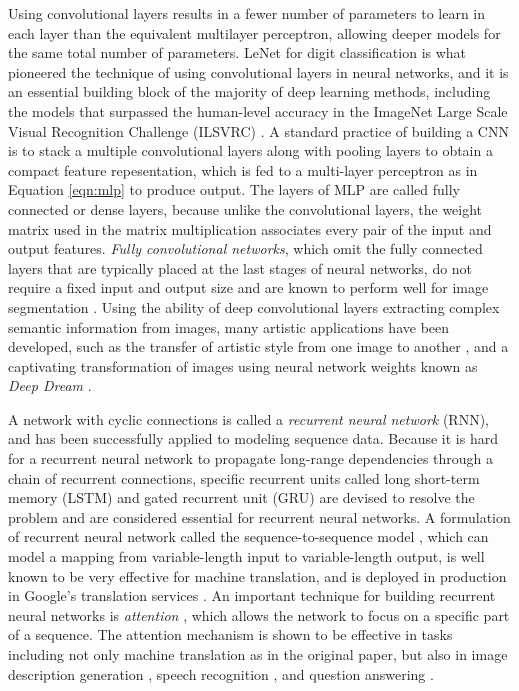 Using convolutional layers results in a fewer number of parameters to learn in each layer than the equivalent multilayer perceptron, allowing deeper models for the same total number of parameters.
LeNet \cite{lecun1995lenet} for digit classification is what pioneered the technique of using convolutional layers in neural networks, and it is an essential building block of the majority of deep learning methods, including the models that surpassed the human-level accuracy in the ImageNet Large Scale Visual Recognition Challenge (ILSVRC) \cite{krizhevsky2012imagenet, simonyan2014vgg, szegedy2015googlenet, he2016resnet}.
A standard practice of building a CNN is to stack a multiple convolutional layers along with pooling layers to obtain a compact feature repesentation, which is fed to a multi-layer perceptron as in Equation \ref{eqn:mlp} to produce output.
The layers of MLP are called fully connected or dense layers, because unlike the convolutional layers, the weight matrix used in the matrix multiplication associates every pair of the input and output features.
\emph{Fully convolutional networks}, which omit the fully connected layers that are typically placed at the last stages of neural networks, do not require a fixed input and output size and are known to perform well for image segmentation \cite{shelhamer2017fcn}.
Using the ability of deep convolutional layers extracting complex semantic information from images, many artistic applications have been developed, such as the transfer of artistic style from one image to another \cite{gatys2015style}, and a captivating transformation of images using neural network weights known as \emph{Deep Dream} \cite{mahendran2016deepdream}.


A network with cyclic connections is called a \emph{recurrent neural network} (RNN), and has been successfully applied to modeling sequence data.
Because it is hard for a recurrent neural network to propagate long-range dependencies through a chain of recurrent connections, specific recurrent units called long short-term memory (LSTM) \cite{hochreiter1997lstm} and gated recurrent unit (GRU) \cite{cho2014seq2seq} are devised to resolve the problem and are considered essential for recurrent neural networks.
A formulation of recurrent neural network called the sequence-to-sequence model \cite{cho2014seq2seq,sutskever2014seq2seq}, which can model a mapping from variable-length input to variable-length output, is well known to be very effective for machine translation, and is deployed in production in Google's translation services \cite{wu2016google}.
An important technique for building recurrent neural networks is \emph{attention} \cite{bahdanau2014attention}, which allows the network to focus on a specific part of a sequence.
The attention mechanism is shown to be effective in tasks including not only machine translation as in the original paper, but also in image description generation \cite{karpathy2017desc}, speech recognition \cite{chorowski2015speech}, and question answering \cite{sukhbaatar2015memory}.

